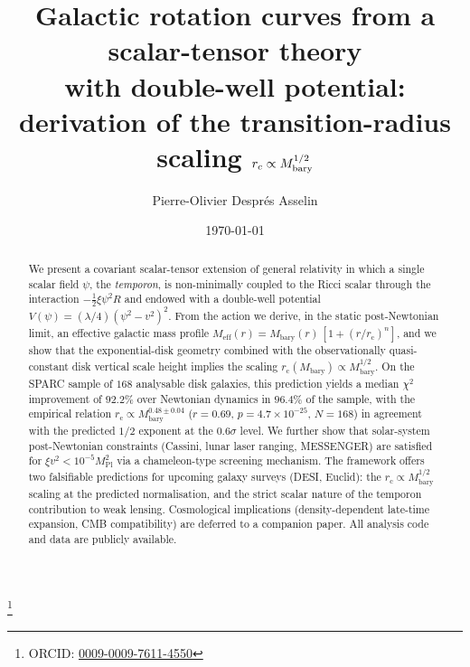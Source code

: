 \documentclass[%
    aps,
    prd,
    reprint,
    superscriptaddress,
    nofootinbib,
    floatfix,
    amsmath,amssymb,
]{revtex4-2}
\newcommand{\Meff}{M_{\mathrm{eff}}}
\newcommand{\Mbary}{M_{\mathrm{bary}}}
\newcommand{\rc}{r_{\mathrm{c}}}
\newcommand{\MPl}{M_{\mathrm{Pl}}}
\begin{document}
\title{Galactic rotation curves from a scalar-tensor theory \\
       with double-well potential: derivation of the
       transition-radius scaling \boldmath$r_{c}\propto M_{\rm bary}^{1/2}$\unboldmath}

\author{Pierre-Olivier Despr\'{e}s Asselin}
\thanks{ORCID: \href{https://orcid.org/0009-0009-7611-4550}{0009-0009-7611-4550}}

\date{\today}

\begin{abstract}
We present a covariant scalar-tensor extension of general relativity
in which a single scalar field $\psi$, the \emph{temporon}, is
non-minimally coupled to the Ricci scalar through the interaction
$-\tfrac{1}{2}\xi\psi^{2}R$ and endowed with a double-well potential
$V(\psi)=(\lambda/4)(\psi^{2}-v^{2})^{2}$. From the action we derive,
in the static post-Newtonian limit, an effective galactic mass profile
$\Meff(r)=\Mbary(r)\,[1+(r/\rc)^{n}]$, and we show that the
exponential-disk geometry combined with the observationally
quasi-constant disk vertical scale height implies the scaling
$\rc(\Mbary)\propto\Mbary^{1/2}$. On the SPARC sample of $168$
analysable disk galaxies, this prediction yields a median $\chi^{2}$
improvement of $92.2\%$ over Newtonian dynamics in $96.4\%$ of the
sample, with the empirical relation
$\rc\propto\Mbary^{0.48\pm 0.04}$
($r=0.69$, $p=4.7\times 10^{-25}$, $N=168$) in agreement with the
predicted $1/2$ exponent at the $0.6\sigma$ level. We further show that
solar-system post-Newtonian constraints (Cassini, lunar laser ranging,
MESSENGER) are satisfied for $\xi v^{2}<10^{-5}\MPl^{2}$ via a
chameleon-type screening mechanism. The framework offers two
falsifiable predictions for upcoming galaxy surveys (DESI, Euclid):
the $\rc\propto\Mbary^{1/2}$ scaling at the predicted normalisation,
and the strict scalar nature of the temporon contribution to weak
lensing. Cosmological implications (density-dependent late-time
expansion, CMB compatibility) are deferred to a companion paper.
All analysis code and data are publicly available.
\end{abstract}

\maketitle

\end{document}
